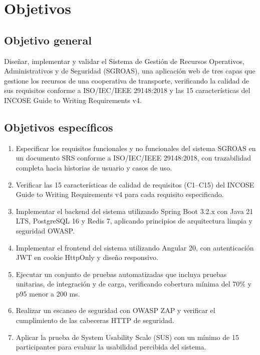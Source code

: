 \section{Objetivos}
\label{sec:objetivos}

\subsection{Objetivo general}

Diseñar, implementar y validar el Sistema de Gestión de Recursos Operativos, Administrativos y de Seguridad (SGROAS), una aplicación web de tres capas que gestione los recursos de una cooperativa de transporte, verificando la calidad de sus requisitos conforme a ISO/IEC/IEEE 29148:2018 y las 15 características del INCOSE Guide to Writing Requirements v4.

\subsection{Objetivos específicos}

\begin{enumerate}
  \item Especificar los requisitos funcionales y no funcionales del sistema SGROAS en un documento SRS conforme a ISO/IEC/IEEE 29148:2018, con trazabilidad completa hacia historias de usuario y casos de uso.

  \item Verificar las 15 características de calidad de requisitos (C1--C15) del INCOSE Guide to Writing Requirements v4 para cada requisito especificado.

  \item Implementar el backend del sistema utilizando Spring Boot 3.2.x con Java 21 LTS, PostgreSQL 16 y Redis 7, aplicando principios de arquitectura limpia y seguridad OWASP.

  \item Implementar el frontend del sistema utilizando Angular 20, con autenticación JWT en cookie HttpOnly y diseño responsivo.

  \item Ejecutar un conjunto de pruebas automatizadas que incluya pruebas unitarias, de integración y de carga, verificando cobertura mínima del 70\% y p95 menor a 200 ms.

  \item Realizar un escaneo de seguridad con OWASP ZAP y verificar el cumplimiento de las cabeceras HTTP de seguridad.

  \item Aplicar la prueba de System Usability Scale (SUS) con un mínimo de 15 participantes para evaluar la usabilidad percibida del sistema.
\end{enumerate}

